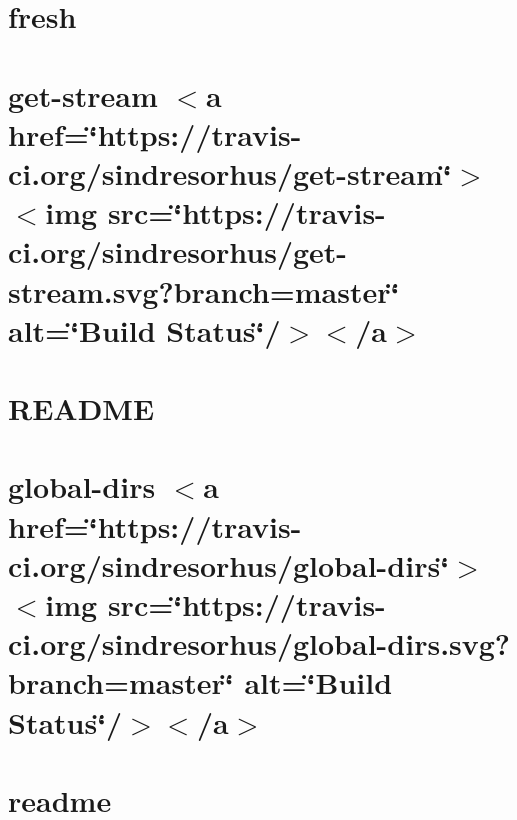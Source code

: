 \let\mypdfximage\pdfximage\def\pdfximage{\immediate\mypdfximage}\documentclass[twoside]{book}
\newcommand{\+}{\discretionary{\mbox{\scriptsize$\hookleftarrow$}}{}{}}
\begin{document}
\chapter{fresh}
\label{md__c_1__git_hub__p_r_o_y_e_c_t_o-_i_i_i-_g_o_t_rest-api-node-mysql_node_modules_fresh__r_e_a_d_m_e}

\chapter{get-\/stream $<$a href=\char`\"{}https\+://travis-\/ci.\+org/sindresorhus/get-\/stream\char`\"{}$>$$<$img src=\char`\"{}https\+://travis-\/ci.\+org/sindresorhus/get-\/stream.\+svg?branch=master\char`\"{} alt=\char`\"{}\+Build Status\char`\"{}/$>$$<$/a$>$}
\label{md__c_1__git_hub__p_r_o_y_e_c_t_o-_i_i_i-_g_o_t_rest-api-node-mysql_node_modules_get-stream_readme}

\chapter{R\+E\+A\+D\+ME}
\label{md__c_1__git_hub__p_r_o_y_e_c_t_o-_i_i_i-_g_o_t_rest-api-node-mysql_node_modules_glob-parent__r_e_a_d_m_e}

\chapter{global-\/dirs $<$a href=\char`\"{}https\+://travis-\/ci.\+org/sindresorhus/global-\/dirs\char`\"{}$>$$<$img src=\char`\"{}https\+://travis-\/ci.\+org/sindresorhus/global-\/dirs.\+svg?branch=master\char`\"{} alt=\char`\"{}\+Build Status\char`\"{}/$>$$<$/a$>$}
\label{md__c_1__git_hub__p_r_o_y_e_c_t_o-_i_i_i-_g_o_t_rest-api-node-mysql_node_modules_global-dirs_readme}

\chapter{readme}
\label{md__c_1__git_hub__p_r_o_y_e_c_t_o-_i_i_i-_g_o_t_rest-api-node-mysql_node_modules_got_readme}

\end{document}
